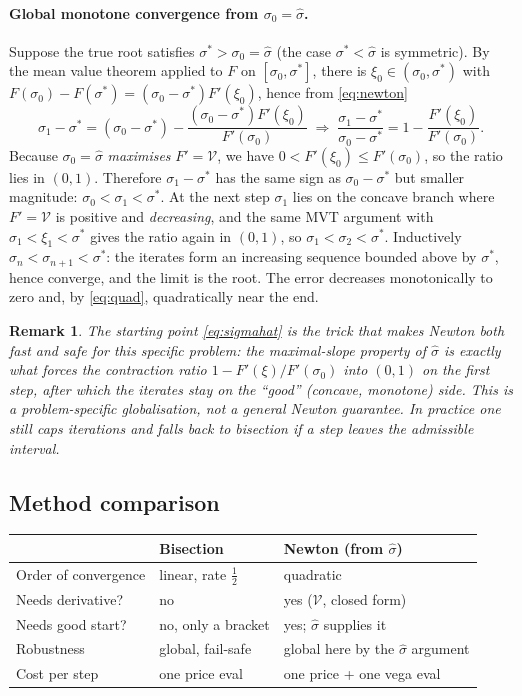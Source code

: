 \documentclass[11pt]{article}
\newtheorem{remark}{Remark}
\newcommand{\Vega}{\mathcal{V}}
\begin{document}
\paragraph{Global monotone convergence from $\sigma_0=\hat\sigma$.} Suppose the true root satisfies
$\sigma^*>\sigma_0=\hat\sigma$ (the case $\sigma^*<\hat\sigma$ is symmetric). By the mean value
theorem applied to $F$ on $[\sigma_0,\sigma^*]$, there is $\xi_0\in(\sigma_0,\sigma^*)$ with
$F(\sigma_0)-F(\sigma^*)=(\sigma_0-\sigma^*)F'(\xi_0)$, hence from \eqref{eq:newton}
\[
\sigma_1-\sigma^*
=(\sigma_0-\sigma^*)-\frac{(\sigma_0-\sigma^*)F'(\xi_0)}{F'(\sigma_0)}
\;\Longrightarrow\;
\frac{\sigma_1-\sigma^*}{\sigma_0-\sigma^*}=1-\frac{F'(\xi_0)}{F'(\sigma_0)}.
\]
Because $\sigma_0=\hat\sigma$ \emph{maximises} $F'=\Vega$, we have $0<F'(\xi_0)\le F'(\sigma_0)$, so
the ratio lies in $(0,1)$. Therefore $\sigma_1-\sigma^*$ has the same sign as $\sigma_0-\sigma^*$
but smaller magnitude: $\sigma_0<\sigma_1<\sigma^*$. At the next step $\sigma_1$ lies on the
concave branch where $F'=\Vega$ is positive and \emph{decreasing}, and the same MVT argument with
$\sigma_1<\xi_1<\sigma^*$ gives the ratio again in $(0,1)$, so $\sigma_1<\sigma_2<\sigma^*$.
Inductively $\sigma_n<\sigma_{n+1}<\sigma^*$: the iterates form an increasing sequence bounded
above by $\sigma^*$, hence converge, and the limit is the root. The error decreases monotonically
to zero and, by \eqref{eq:quad}, quadratically near the end.

\begin{remark}
The starting point \eqref{eq:sigmahat} is the trick that makes Newton both fast and safe for this
specific problem: the maximal-slope property of $\hat\sigma$ is exactly what forces the
contraction ratio $1-F'(\xi)/F'(\sigma_0)$ into $(0,1)$ on the first step, after which the
iterates stay on the ``good'' (concave, monotone) side. This is a problem-specific globalisation,
not a general Newton guarantee. In practice one still caps iterations and falls back to bisection
if a step leaves the admissible interval.
\end{remark}

\subsection{Method comparison}

\begin{center}
\begin{tabular}{lll}
\hline
 & \textbf{Bisection} & \textbf{Newton (from $\hat\sigma$)}\\
\hline
Order of convergence & linear, rate $\tfrac12$ & quadratic\\
Needs derivative? & no & yes ($\Vega$, closed form)\\
Needs good start? & no, only a bracket & yes; $\hat\sigma$ supplies it\\
Robustness & global, fail-safe & global here by the $\hat\sigma$ argument\\
Cost per step & one price eval & one price + one vega eval\\
\hline
\end{tabular}
\end{center}
\end{document}
